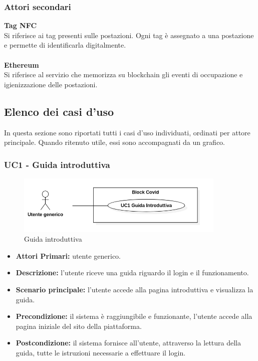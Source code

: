 \subsubsection{Attori secondari}
\textbf{Tag NFC}\\
Si riferisce ai tag presenti sulle postazioni. Ogni tag è assegnato a una postazione e permette di identificarla digitalmente.\\
\\
\textbf{Ethereum}\\
Si riferisce al servizio che memorizza su blockchain gli eventi di occupazione e igienizzazione delle postazioni.\\

\subsection{Elenco dei casi d'uso}
In questa sezione sono riportati tutti i casi d'uso individuati, ordinati per attore principale. Quando ritenuto utile, essi sono accompagnati da un grafico.
\\
\subsubsection{ UC1 - Guida introduttiva}
\begin{figure}[H]
	\centering
	\includegraphics[width=10cm]{res/images/UC1.png}
	\caption{Guida introduttiva}
\end{figure}
\begin{itemize}
           	\item\textbf{Attori Primari:} utente generico.
           	\item\textbf{Descrizione:} l'utente riceve una guida riguardo il login e il funzionamento.
           	\item\textbf{Scenario principale:} l’utente accede alla pagina introduttiva e visualizza la guida.
           	\item\textbf{Precondizione:} il sistema è raggiungibile e funzionante, l’utente accede alla pagina iniziale del sito della piattaforma.
           	\item\textbf{Postcondizione:} il sistema fornisce all’utente, attraverso la lettura della guida, tutte le istruzioni necessarie a effettuare il login.
\end{itemize}

